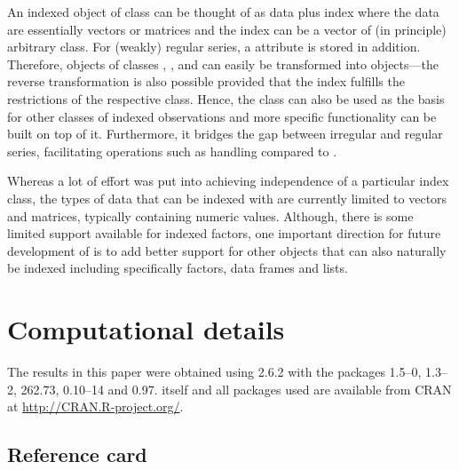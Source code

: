 \documentclass{Z}
\begin{document}
An indexed object of class  can be thought of as data plus index
where the data are essentially vectors or matrices and the index can be
a vector of (in principle) arbitrary class. For (weakly) regular 
series, a  attribute is stored in addition. Therefore, objects of classes
, ,  and  can easily
be transformed into  objects---the reverse transformation is also possible 
provided that the index fulfills the restrictions of the respective class.
Hence, the  class can also be used as the basis for other
classes of indexed observations and more specific functionality can be built on
top of it. Furthermore, it bridges the gap between irregular and regular series,
facilitating operations such as  handling compared to .

Whereas a lot of effort was put into achieving independence of a particular
index class, the types of data that can be indexed with  are currently
limited to vectors and matrices, typically containing numeric values. Although,
there is some limited support available for indexed factors, one important 
direction for future development of  is to add better support for other
objects that can also naturally be indexed including specifically factors, data
frames and lists.



\section*{Computational details}

The results in this paper were obtained using 
2.6.2 with the packages
 1.5--0,
 1.3--2,
 262.73,
 0.10--14 and
 0.97.
 itself and all packages used are available from
CRAN at \url{http://CRAN.R-project.org/}.




\newpage

\begin{appendix}
\section{Reference card}

\end{appendix}
\end{document}
